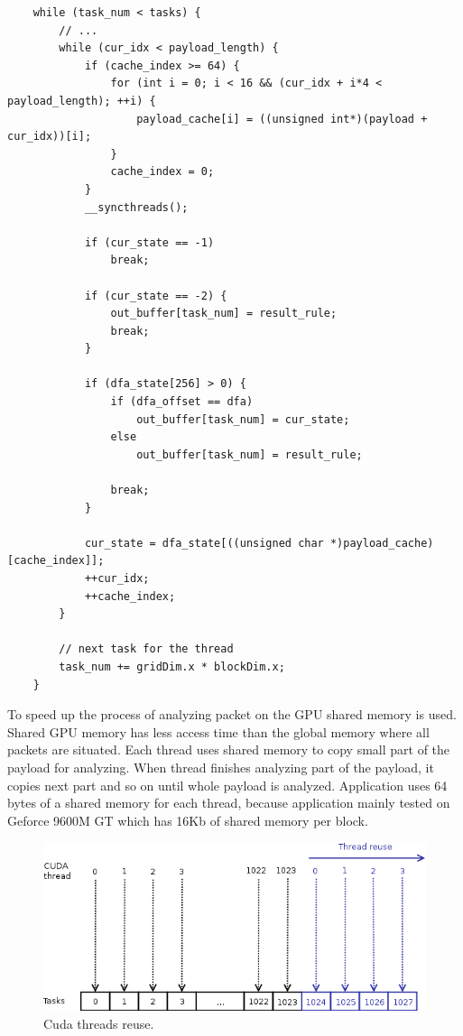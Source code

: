 \documentclass[thesis=M,english]{FITthesis}[2011/07/15]
\begin{document}
\begin{lstlisting}
    while (task_num < tasks) {
        // ...
        while (cur_idx < payload_length) {
            if (cache_index >= 64) {
                for (int i = 0; i < 16 && (cur_idx + i*4 < payload_length); ++i) {
                    payload_cache[i] = ((unsigned int*)(payload + cur_idx))[i];
                }
                cache_index = 0;
            }
            __syncthreads();

            if (cur_state == -1)
                break;

            if (cur_state == -2) {
                out_buffer[task_num] = result_rule;
                break;
            }

            if (dfa_state[256] > 0) {
                if (dfa_offset == dfa)
                    out_buffer[task_num] = cur_state;
                else
                    out_buffer[task_num] = result_rule;

                break;
            }

            cur_state = dfa_state[((unsigned char *)payload_cache)[cache_index]];
            ++cur_idx;
            ++cache_index;
        }

        // next task for the thread
        task_num += gridDim.x * blockDim.x;
    }
\end{lstlisting}

To speed up the process of analyzing packet on the GPU shared memory is used. Shared GPU memory has less access time than the global memory where all packets are situated. Each thread uses shared memory to copy small part of the payload for analyzing. When thread finishes analyzing part of the payload, it copies next part and so on until whole payload is analyzed. Application uses 64 bytes of a shared memory for each thread, because application mainly tested on Geforce 9600M GT which has 16Kb of shared memory per block.

\begin{figure}[h]
\centering
\includegraphics[scale=0.5]{images/cuda_thread_reuse.png}
\caption{Cuda threads reuse.}
\label{fig:cuda_thread_reuse}
\end{figure}
\end{document}
